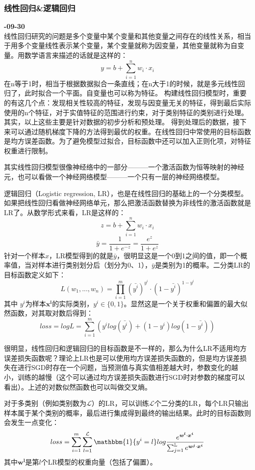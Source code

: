 \subsubsection{线性回归\&逻辑回归}
\textbf{-09-30}\\
线性回归研究的问题是多个变量中某个变量和其他变量之间存在的线性关系，相当于用多个变量线性表示某个变量，某个变量就称为因变量，其他变量就称为自变量。用数学语言来描述的话就是这样的：
$$
y=b + \sum_{i=1}^{n} w_i \cdot x_i 
$$
在n等于1时，相当于根据数据拟合一条直线；在n大于1的时候，就是多元线性回归了，此时拟合一个平面。自变量也可以称为特征。
构建线性回归模型时，重要的有这几个点：发现相关性较高的特征，发现与因变量无关的特征，得到最后实际使用的n个特征，对于实值特征的范围进行约束，对于类别特征的类别进行处理。其实，以上这些主要是针对数据的初步分析和预处理。
得到处理后的数据，接下来可以通过随机梯度下降的方法得到最优的权重。在线性回归中常使用的目标函数是均方误差函数。为了避免模型过拟合，目标函数中还可以加入正则化项，对特征权重进行限制。

其实线性回归模型很像神经络中的一部分———一个激活函数为恒等映射的神经元，也可以看做一个神经网络模型———一个只有一层的神经网络模型。

逻辑回归（Logistic regression, LR），也是在线性回归的基础上的一个分类模型。如果把线性回归看做神经网络单元，那么把激活函数替换为非线性的激活函数就是LR了。从数学形式来看，LR是这样的：
$$
z = b + \sum_{i=1}^{n} w_i \cdot x_i 
$$
$$
\bar{y} = \frac{1}{1 + e^{-z}} = \frac{e^z}{1 + e^z}
$$
针对一个样本$x$，LR模型得到的就是$\bar{y}$，很明显这是一个0到1之间的值，即一个概率值，当对样本进行类别划分后（划分为0、1），$\bar{y}$是类别为1的概率。二分类LR的目标函数定义如下：
$$
L(w_1,...,w_n) = \prod_{i = 1}^{m} (\bar{y^i} )^{y^i} \cdot ( 1 - \bar{y^i}) ^ {1 - y^i}
$$
其中 $y^i$为样本$\boldsymbol{x^i}$的实际类别，$y^i \in \{0, 1\}$。显然这是一个关于权重和偏置的最大似然函数，对其取对数后得到：
$$
loss = log L = \sum_{i=1}^{m} \left( y^i log (\bar{y^i}) + (1 - y^i) log ( 1 - \bar{y^i}) \right)
$$

很明显，线性回归和逻辑回归的目标函数是不一样的，那么为什么LR不适用均方误差损失函数呢？理论上LR也是可以使用均方误差损失函数的，但是均方误差损失在进行SGD时存在一个问题，当预测值与真实值相差越大时，参数变化的越小，训练的越慢（{\color{red}这个可以通过均方误差损失函数进行SGD时对参数的梯度可以看出}）。上述的对数似然函数也可以叫做交叉熵。

对于多类别（例如类别数为$\mathcal{L}$）的LR，可以训练$\mathcal{L}$个二分类的LR，每个LR只输出样本属于某个类别的概率，最后进行集成得到最终的输出结果。此时的目标函数则会发生一点变化：
$$
loss = \sum_{i=1}^{m} \sum_{l=1}^{\mathcal{L}} \mathbbm{1}\{y^i = l\} log \frac{e^{ \boldsymbol{w^l} \cdot \boldsymbol{x^i} } }{ \sum_{j=1}^{\mathbb{L}} e^{ \boldsymbol{w^j} \cdot \boldsymbol{x^i}} }
$$
其中$\boldsymbol{w^l}$是第$l$个LR模型的权重向量（包括了偏置）。

